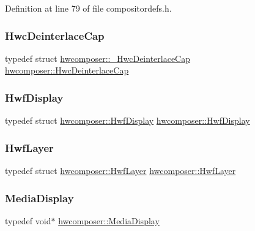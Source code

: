 Definition at line 79 of file compositordefs.\+h.

\mbox{\label{namespacehwcomposer_ae1b4391653ed2be718742b547c67e400}} 
\subsubsection{\texorpdfstring{Hwc\+Deinterlace\+Cap}{HwcDeinterlaceCap}}
{\footnotesize\ttfamily typedef struct \mbox{\hyperlink{structhwcomposer_1_1__HwcDeinterlaceCap}{hwcomposer\+::\+\_\+\+Hwc\+Deinterlace\+Cap}}  \mbox{\hyperlink{namespacehwcomposer_ae1b4391653ed2be718742b547c67e400}{hwcomposer\+::\+Hwc\+Deinterlace\+Cap}}}

\mbox{\label{namespacehwcomposer_a04bc26c3d4bbc34c05959dca8eaea1f4}} 
\subsubsection{\texorpdfstring{Hwf\+Display}{HwfDisplay}}
{\footnotesize\ttfamily typedef struct \mbox{\hyperlink{structhwcomposer_1_1HwfDisplay}{hwcomposer\+::\+Hwf\+Display}}  \mbox{\hyperlink{structhwcomposer_1_1HwfDisplay}{hwcomposer\+::\+Hwf\+Display}}}

\mbox{\label{namespacehwcomposer_a153bd861ad56f99f647093306b5d51ed}} 
\subsubsection{\texorpdfstring{Hwf\+Layer}{HwfLayer}}
{\footnotesize\ttfamily typedef struct \mbox{\hyperlink{structhwcomposer_1_1HwfLayer}{hwcomposer\+::\+Hwf\+Layer}}  \mbox{\hyperlink{structhwcomposer_1_1HwfLayer}{hwcomposer\+::\+Hwf\+Layer}}}

\mbox{\label{namespacehwcomposer_a10d64930907cc775f9cea6b39d8cb404}} 
\subsubsection{\texorpdfstring{Media\+Display}{MediaDisplay}}
{\footnotesize\ttfamily typedef void$\ast$ \mbox{\hyperlink{namespacehwcomposer_a10d64930907cc775f9cea6b39d8cb404}{hwcomposer\+::\+Media\+Display}}}



